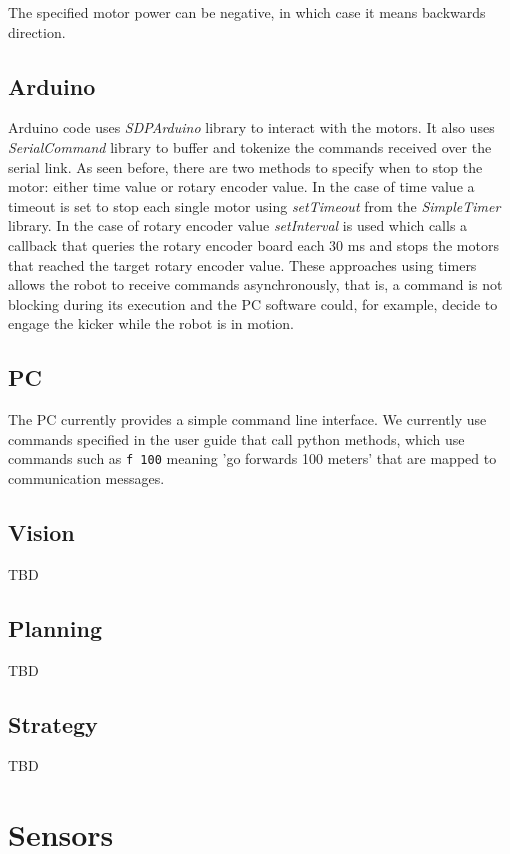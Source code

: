 \documentclass[12pt]{article}
\begin{document}
The specified motor power can be negative, in which case it means backwards
direction.

\subsection{Arduino}

Arduino code uses \textit{SDPArduino} library to interact with the motors.
It also uses \textit{SerialCommand} library to buffer and tokenize the
commands received over the serial link. As seen before, there are two methods to
specify when to stop the motor: either time value or rotary encoder value.
In the case of time value a timeout is set to stop each single motor using
\textit{setTimeout} from the \textit{SimpleTimer} library.
In the case of rotary encoder value \textit{setInterval} is used which calls
a callback that queries the rotary encoder board each 30 ms and stops the motors
that reached the target rotary encoder value. These approaches using timers
allows the robot to receive commands asynchronously, that is, a command is not
blocking during its execution and the PC software could, for example, decide
to engage the kicker while the robot is in motion.

\subsection{PC}

The PC currently provides a simple command line interface. We currently use commands specified in the user guide that call python methods, which use commands such as \texttt{f 100} meaning 'go forwards 100 meters' that are mapped to communication messages. 

\subsection{Vision}

TBD

\subsection{Planning}

TBD

\subsection{Strategy}

TBD

\section{Sensors}
\end{document}
